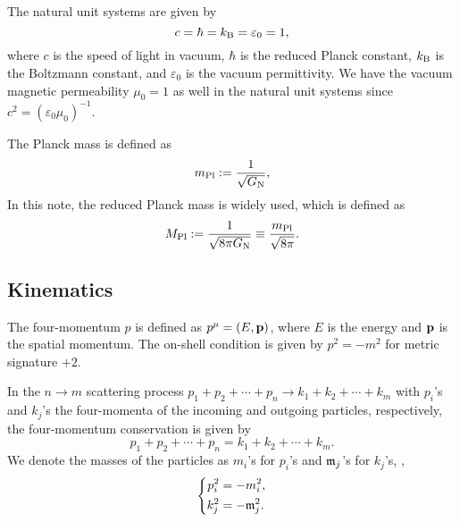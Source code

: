\documentclass{article}
\begin{document}
            The natural unit systems are given by 
            \begin{equation}
                c = \hbar = k_\mathrm{B} = \varepsilon_0 = 1,
            \end{equation}
            where $c$ is the speed of light in vacuum, $\hbar$ is the reduced Planck constant, $k_\mathrm{B}$ is the Boltzmann constant, and $\varepsilon_0$ is the vacuum permittivity.
            We have the vacuum magnetic permeability $\mu_0 = 1$ as well in the natural unit systems since $c^2 = (\varepsilon_0 \mu_0)^{-1}$.

            The Planck mass is defined as
            \begin{equation}
                m_\mathrm{Pl} := \frac{1}{\sqrt{G_\mathrm{N}}},
            \end{equation}
            In this note, the reduced Planck mass is widely used, which is defined as
            \begin{equation}
                M_\mathrm{Pl} := \frac{1}{\sqrt{8 \pi G_\mathrm{N}}} \equiv \frac{m_\mathrm{Pl}}{\sqrt{8 \pi}}.
                \label{eq:reduced-Planck-mass}
            \end{equation}

        \subsection{Kinematics}

            The four-momentum $p$ is defined as $p^\mu = (E, \vb{p})$, where $E$ is the energy and $\vb{p}$ is the spatial momentum.
            The on-shell condition is given by $p^2 = -m^2$ for metric signature $+2$.

            In the $n \to m$ scattering process $p_1 + p_2 + \cdots + p_n \to k_1 + k_2 + \cdots + k_m$ with $p_i$'s and $k_j$'s the four-momenta of the incoming and outgoing particles, respectively, the four-momentum conservation is given by
            \begin{equation}
                p_1 + p_2 + \cdots + p_n = k_1 + k_2 + \cdots + k_m.
            \end{equation}
            We denote the masses of the particles as $m_i$'s for $p_i$'s and $\mathfrak{m}_j$'s for $k_j$'s, \ie,
            \begin{equation}
                \left\{
                    \begin{aligned}
                        p_i^2 & = -m_i^2, \\
                        k_j^2 & = -\mathfrak{m}_j^2.
                    \end{aligned}
                \right.
            \end{equation}
            
\end{document}
